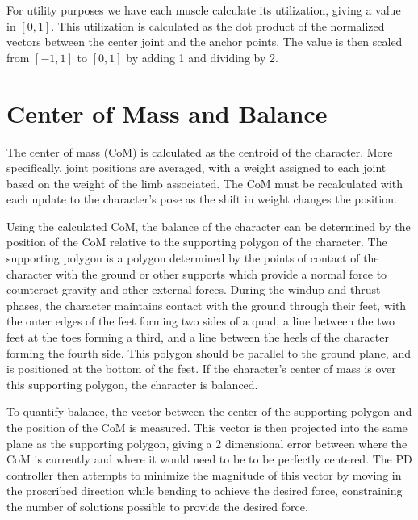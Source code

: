 \begin{table}[ht]
	\centering
	
	\caption[Table of estimated forces given $k$ values and times]{}
	\label{tab:force_est}
\end{table}

For utility purposes we have each muscle calculate its utilization, giving a value in $[0,1]$.  This utilization is calculated as the dot product of the normalized vectors between the center joint and the anchor points.  The value is then scaled from $[-1, 1]$ to $[0,1]$ by adding 1 and dividing by 2.

\section{Center of Mass and Balance}
\label{section:com}
The center of mass (CoM) is calculated as the centroid of the character.  More specifically, joint positions are averaged, with a weight assigned to each joint based on the weight of the limb associated.  The CoM must be recalculated with each update to the character's pose as the shift in weight changes the position.

Using the calculated CoM, the balance of the character can be determined by the position of the CoM relative to the supporting polygon of the character.  The supporting polygon is a polygon determined by the points of contact of the character with the ground or other supports which provide a normal force to counteract gravity and other external forces.  During the windup and thrust phases, the character maintains contact with the ground through their feet, with the outer edges of the feet forming two sides of a quad, a line between the two feet at the toes forming a third, and a line between the heels of the character forming the fourth side.  This polygon should be parallel to the ground plane, and is positioned at the bottom of the feet.  If the character's center of mass is over this supporting polygon, the character is balanced.

To quantify balance, the vector between the center of the supporting polygon and the position of the CoM is measured.  This vector is then projected into the same plane as the supporting polygon, giving a 2 dimensional error between where the CoM is currently and where it would need to be to be perfectly centered.  The PD controller then attempts to minimize the magnitude of this vector by moving in the proscribed direction while bending to achieve the desired force, constraining the number of solutions possible to provide the desired force.


